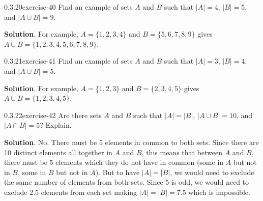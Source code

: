 \documentclass[twoside,11pt,]{book}
\numberwithin{equation}{chapter}
\begin{document}
\begin{divisionsolution}{0.3.20}{}{exercise-40}%
\hypertarget{p-733}{}%
Find an example of sets \(A\) and \(B\) such that \(|A| = 4\), \(|B| = 5\), and \(|A \cup B| = 9\).%
\par\smallskip%
\noindent\textbf{Solution}.\quad%
\hypertarget{p-734}{}%
For example, \(A = \{1,2,3,4\}\) and \(B = \{5,6,7,8,9\}\) gives \(A \cup B = \{1,2,3,4,5,6,7,8,9\}\).%
\end{divisionsolution}%
\begin{divisionsolution}{0.3.21}{}{exercise-41}%
\hypertarget{p-735}{}%
Find an example of sets \(A\) and \(B\) such that \(|A| = 3\), \(|B| = 4\), and \(|A \cup B| = 5\).%
\par\smallskip%
\noindent\textbf{Solution}.\quad%
\hypertarget{p-736}{}%
For example, \(A = \{1,2,3\}\) and \(B = \{2,3,4,5\}\) gives \(A\cup B = \{1,2,3,4,5\}\).%
\end{divisionsolution}%
\begin{divisionsolution}{0.3.22}{}{exercise-42}%
\hypertarget{p-737}{}%
Are there sets \(A\) and \(B\) such that \(|A| = |B|\), \(|A\cup B| = 10\), and \(|A\cap B| = 5\)? Explain.%
\par\smallskip%
\noindent\textbf{Solution}.\quad%
\hypertarget{p-738}{}%
No. There must be 5 elements in common to both sets. Since there are 10 distinct elements all together in \(A\) and \(B\), this means that between \(A\) and \(B\), there must be 5 elements which they do not have in common (some in \(A\) but not in \(B\), some in \(B\) but not in \(A\)). But to have \(|A| = |B|\), we would need to exclude the same number of elements from both sets. Since 5 is odd, we would need to exclude 2.5 elements from each set making \(|A| = |B| = 7.5\) which is impossible.%
\end{divisionsolution}%
\end{document}
